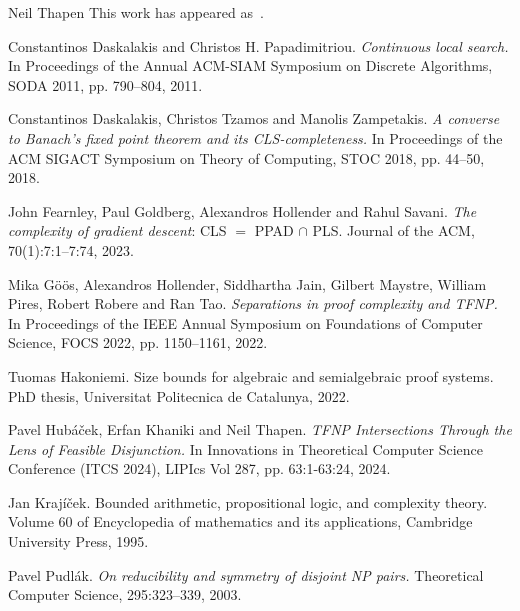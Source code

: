 \documentclass[report]{owrart}
\begin{document}
\begin{report}
\begin{talk}{Neil Thapen}
This work has appeared as~\cite{hub}.
          
       
           \begin{thebibliography}{99}
           
            Constantinos Daskalakis and Christos H. Papadimitriou. 
            {\it Continuous local search.}
            In Proceedings of the Annual ACM-SIAM
            Symposium on Discrete Algorithms, SODA 2011, pp. 790–804, 2011.
            
            Constantinos Daskalakis, Christos Tzamos and Manolis Zampetakis. 
            {\it A converse to Banach’s fixed point theorem and its CLS-completeness.}
            In Proceedings of the ACM
            SIGACT Symposium on Theory of Computing, STOC 2018, pp. 44–50, 2018.
            
            John Fearnley, Paul Goldberg, Alexandros Hollender and Rahul Savani. 
            {\it The complexity of gradient descent}: CLS $=$ PPAD $\cap$ PLS. 
            Journal of the ACM, 70(1):7:1–7:74, 2023.
            
            Mika G\"o\"os, Alexandros Hollender, Siddhartha Jain, Gilbert Maystre, William Pires,
            Robert Robere and Ran Tao. 
            {\it Separations in proof complexity and TFNP.} 
            In Proceedings of the IEEE Annual Symposium on Foundations of Computer Science, FOCS 2022,
            pp. 1150–1161, 2022.
            
            Tuomas Hakoniemi. 
            Size bounds for algebraic and semialgebraic proof systems. PhD
            thesis, Universitat Politecnica de Catalunya, 2022.
            
            Pavel Hubáček, Erfan Khaniki and Neil Thapen. 
            {\it TFNP Intersections Through the Lens of Feasible Disjunction.} 
            In Innovations in Theoretical Computer Science Conference (ITCS 2024), LIPIcs Vol 287, pp. 63:1-63:24, 
            2024.
            
            Jan Kraj\'{i}\v{c}ek.
            Bounded arithmetic, propositional logic, and complexity theory.
            Volume 60 of Encyclopedia of mathematics and its applications,
            Cambridge University Press, 1995.
            
            Pavel Pudl\'{a}k. 
            {\it On reducibility and symmetry of disjoint NP pairs.}
            Theoretical Computer Science, 295:323–339, 2003.
            

\end{thebibliography}
\end{talk}
\end{report}
\end{document}
